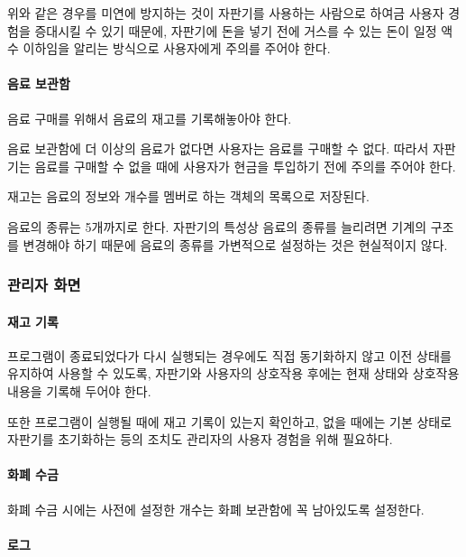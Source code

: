 \documentclass{oblivoir}
\begin{document}
    위와 같은 경우를 미연에 방지하는 것이
    자판기를 사용하는 사람으로 하여금
    사용자 경험을 증대시킬 수 있기 때문에,
    자판기에 돈을 넣기 전에 거스를 수 있는 돈이 일정 액수 이하임을
    알리는 방식으로 사용자에게 주의를 주어야 한다.

    \paragraph{음료 보관함}

    음료 구매를 위해서 음료의 재고를 기록해놓아야 한다.

    음료 보관함에 더 이상의 음료가 없다면 사용자는 음료를
    구매할 수 없다.
    따라서 자판기는 음료를 구매할 수 없을 때에 사용자가 현금을 투입하기 전에
    주의를 주어야 한다.

    재고는 음료의 정보와 개수를 멤버로 하는 객체의 목록으로 저장된다.

    음료의 종류는 5개까지로 한다.
    자판기의 특성상 음료의 종류를 늘리려면 기계의 구조를 변경해야
    하기 때문에 음료의 종류를 가변적으로 설정하는 것은 현실적이지 않다.

    \subsubsection{관리자 화면}

    \paragraph{재고 기록}

    프로그램이 종료되었다가 다시 실행되는 경우에도 직접 동기화하지 않고
    이전 상태를 유지하여 사용할 수 있도록,
    자판기와 사용자의 상호작용 후에는 현재 상태와 상호작용 내용을
    기록해 두어야 한다.

    또한 프로그램이 실행될 때에 재고 기록이 있는지 확인하고,
    없을 때에는 기본 상태로 자판기를 초기화하는 등의 조치도
    관리자의 사용자 경험을 위해 필요하다.

    \paragraph{화폐 수금}

    화폐 수금 시에는 사전에 설정한 개수는 화폐 보관함에 꼭 남아있도록
    설정한다.

    \paragraph{로그}
\end{document}
